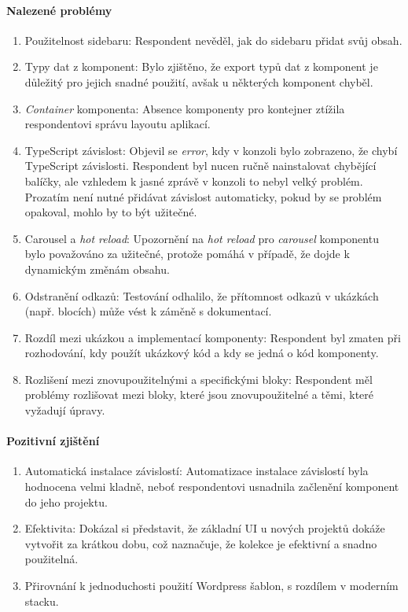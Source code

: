 \paragraph{Nalezené problémy}
\begin{enumerate}
  \item Použitelnost sidebaru: Respondent nevěděl, jak do sidebaru přidat svůj obsah.
  \item Typy dat z komponent: Bylo zjištěno, že export typů dat z komponent je důležitý pro jejich snadné použití, avšak u některých komponent chyběl.
  \item \emph{Container} komponenta: Absence komponenty pro kontejner ztížila respondentovi správu layoutu aplikací.
  \item TypeScript závislost: Objevil se \emph{error}, kdy v konzoli bylo zobrazeno, že chybí TypeScript závislosti. Respondent byl nucen ručně nainstalovat chybějící balíčky, ale vzhledem k jasné zprávě v konzoli to nebyl velký problém. Prozatím není nutné přidávat závislost automaticky, pokud by se problém opakoval, mohlo by to být užitečné.
  \item Carousel a \emph{hot reload}: Upozornění na \emph{hot reload} pro \emph{carousel} komponentu bylo považováno za užitečné, protože pomáhá v případě, že dojde k dynamickým změnám obsahu.
  \item Odstranění odkazů: Testování odhalilo, že přítomnost odkazů v ukázkách (např. blocích) může vést k záměně s dokumentací.
  \item Rozdíl mezi ukázkou a implementací komponenty: Respondent byl zmaten při rozhodování, kdy použít ukázkový kód a kdy se jedná o kód komponenty.
  \item Rozlišení mezi znovupoužitelnými a specifickými bloky: Respondent měl problémy rozlišovat mezi bloky, které jsou znovupoužitelné a těmi, které vyžadují úpravy.
\end{enumerate}

\paragraph{Pozitivní zjištění}
\begin{enumerate}
  \item Automatická instalace závislostí: Automatizace instalace závislostí byla hodnocena velmi kladně, neboť respondentovi usnadnila začlenění komponent do jeho projektu.
  \item Efektivita: Dokázal si představit, že základní UI u nových projektů dokáže vytvořit za krátkou dobu, což naznačuje, že kolekce je efektivní a snadno použitelná.
  \item Přirovnání k jednoduchosti použití Wordpress šablon, s rozdílem v moderním stacku.
\end{enumerate}

